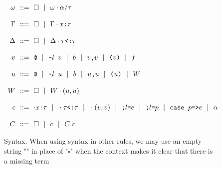 \documentclass[acmsmall]{acmart}
\theoremstyle{definition}
\begin{document}
\begin{figure*}[h]
\[\begin{array}[t]{r@{}l}
\nonterm{\omega} & \is 
  \square \sep \omega \cdot \alpha \slash \tau
\\  
\\  
\nonterm{\Gamma} & \is 
  \square \sep \Gamma \cdot \code{$x$:$\tau$}
\\
\\  
\nonterm{\Delta} & \is 
  \square \sep \Delta \cdot \code{$\tau$<:$\tau$}
\\
\\
\nonterm{v} & \is 
  \code{@} \sep
  \code{\textasciitilde{}$l$ $v$} \sep
  b \sep
  \code{$v$,$v$} \sep
  \code{($v$)} \sep
  f
\\
\\
\nonterm{u} & \is 
  \code{@} \sep
  \code{\textasciitilde{}$l$ $u$} \sep
  b \sep
  \code{$u$,$u$} \sep
  \code{($u$)} \sep
  W
\\
\\
\nonterm{W} & \is 
  \square \sep W \cdot (u,u)
\\
\\
\nonterm{c} & \is 
  \cdot \code{$x$:$\tau$} \sep 
  \cdot \code{$\tau$<:$\tau$} \sep
  \cdot (v,v) \sep 
  \code{;$l$=$e$} \sep
  \code{;$l$=$p$} \sep
  \code{case $p$=>$e$} \sep
  \alpha
\\
\\
\nonterm{C} & \is 
  \square \sep c \sep C\ c
\end{array}
\]

\caption{Syntax. When using syntax in other rules, we may use an empty string "" in place of "$\square$" when the context makes it clear that there is a missing term}
\label{fig:syntax}
\end{figure*}
\end{document}
